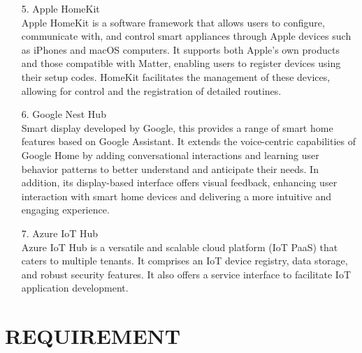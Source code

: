 \documentclass[conference]{IEEEtran}
\begin{document}
\begin{itemize}
\\
\item [5.]Apple HomeKit\\
Apple HomeKit is a software framework that allows users to configure, communicate with, and control smart appliances through Apple devices such as iPhones and macOS computers. It supports both Apple’s own products and those compatible with Matter, enabling users to register devices using their setup codes. HomeKit facilitates the management of these devices, allowing for control and the registration of detailed routines.
\\
\item [6.]Google Nest Hub\\
Smart display developed by Google, this provides a range of smart home features based on Google Assistant. It extends the voice-centric capabilities of Google Home by adding conversational interactions and learning user behavior patterns to better understand and anticipate their needs. In addition, its display-based interface offers visual feedback, enhancing user interaction with smart home devices and delivering a more intuitive and engaging experience.
\\
\item [7.]Azure IoT Hub\\
Azure IoT Hub is a versatile and scalable cloud platform (IoT PaaS) that caters to multiple tenants. It comprises an IoT device registry, data storage, and robust security features. It also offers a service interface to facilitate IoT application development.

\end{itemize}


\section{REQUIREMENT}
\end{document}
